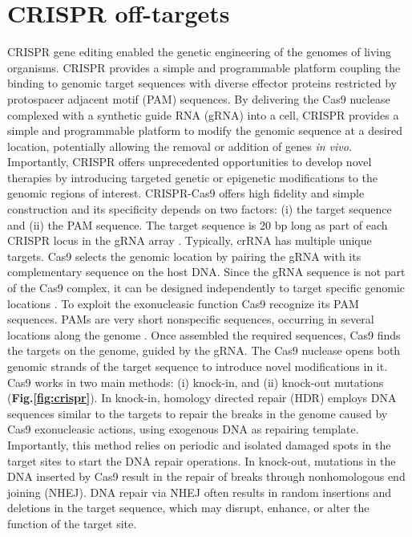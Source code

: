 \documentclass[a4paper, titlepage, openright]{book}
\newcommand{\mychapter}[2]{
    \setcounter{chapter}{#1}
    \setcounter{section}{0}
    \chapter*{#2}
    \addcontentsline{toc}{chapter}{#2}
}
\begin{document}
\mychapter{6}{CRISPR off-targets}
CRISPR gene editing \citep{cong2013multiplex} enabled the genetic engineering of the genomes of living organisms. CRISPR provides a simple and programmable platform coupling the binding to genomic target sequences with diverse effector proteins restricted by protospacer adjacent motif (PAM) sequences. By delivering the Cas9 nuclease complexed with a synthetic guide RNA (gRNA) into a cell, CRISPR provides a simple and programmable platform to modify the genomic sequence at a desired location, potentially allowing the removal or addition of genes \emph{in vivo}. Importantly, CRISPR offers unprecedented opportunities to develop novel therapies by introducing targeted genetic or epigenetic modifications to the genomic regions of interest. CRISPR-Cas9 offers high fidelity and simple construction and  its specificity depends on two factors: (i) the target sequence and (ii) the PAM sequence. The target sequence is 20 bp long as part of each CRISPR locus in the gRNA array \citep{ran2013genome}. Typically, crRNA has multiple unique targets. Cas9 selects the genomic location by pairing the gRNA with its complementary sequence on the host DNA. Since the gRNA sequence is not part of the Cas9 complex, it can be designed independently to target specific genomic locations \citep{bialk2015regulation}. To exploit the exonucleasic function Cas9 recognize its PAM sequences. PAMs are very short nonspecific sequences, occurring in several locations along the genome \citep{ran2013genome}. Once assembled the required sequences, Cas9 finds the targets on the genome, guided by the gRNA. The Cas9 nuclease opens both genomic strands of the target sequence to introduce novel modifications in it. Cas9 works in two main methods: (i) knock-in, and (ii) knock-out mutations (\textbf{Fig.\ref{fig:crispr}}). In knock-in, homology directed repair (HDR) employs  DNA sequences similar to the targets to repair the breaks in the genome caused by Cas9 exonucleasic actions, using exogenous DNA as repairing template. Importantly, this method relies on periodic and isolated damaged spots in the target sites to start the DNA repair operations. In knock-out, mutations in the DNA inserted by Cas9 result in the repair of breaks through nonhomologous end joining (NHEJ). DNA repair via NHEJ often results in random insertions and deletions in the target sequence, which may disrupt, enhance, or alter the function of the target site.
\end{document}
